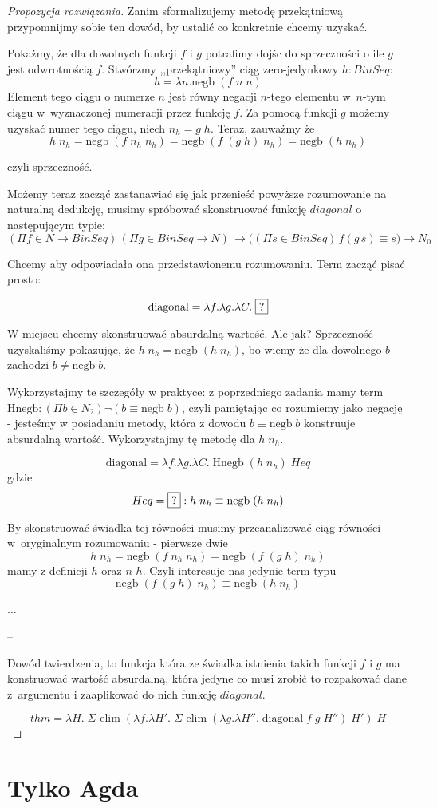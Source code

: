 \documentclass[11pt, a4paper]{article}
\begin{document}
\begin{proof}[Propozycja rozwiązania]
Zanim sformalizujemy metodę przekątniową przypomnijmy sobie ten dowód, by ustalić co konkretnie chcemy uzyskać.

Pokażmy, że dla dowolnych funkcji $f$ i $g$ potrafimy dojśc do sprzeczności o ile $g$ jest odwrotnością $f$.
Stwórzmy ,,przekątniowy'' ciąg zero-jedynkowy $h : BinSeq$:
\[
 h = \lambda n. \mbox{negb}\;(f\;n\;n)
\]
Element tego ciągu o numerze $n$ jest równy negacji $n$-tego elementu w~$n$-tym ciągu w~wyznaczonej numeracji
przez funkcję $f$. Za pomocą funkcji $g$ możemy uzyskać numer tego ciągu, niech $n_h = g\;h$. Teraz, zauważmy że
\[
h\;n_h = \mbox{negb}\;(f\;n_h\;n_h) = \mbox{negb}\;(f\;(g\;h)\;n_h) = \mbox{negb}\;(h \;n_h)
\]

czyli sprzeczność.


Możemy teraz zacząć zastanawiać się jak przenieść powyższe rozumowanie na naturalną dedukcję, musimy
spróbować skonstruować
funkcję $diagonal$ o następującym typie:
{
\small
\[
 (\Pi f \in N \to BinSeq)\, (\Pi g \in BinSeq \to N)\,
\to
\big(
(\Pi s \in BinSeq)\,f (g\, s) \equiv s 
\big)
\to N_0
\]
}

Chcemy aby odpowiadała ona przedstawionemu rozumowaniu. Term zacząć pisać prosto:

\[
  \mbox{diagonal} = \lambda f.\lambda g. \lambda C.\; \framebox{?}
\]

W miejscu  chcemy skonstruować absurdalną wartość. Ale jak? Sprzeczność uzyskaliśmy
pokazując, że $h\;n_h = \mbox{negb}\; (h\;n_h)$, bo wiemy że dla dowolnego $b$ zachodzi $b \not= \mbox{negb}\;b$.

Wykorzystajmy te szczegóły w praktyce: z poprzedniego zadania mamy term
$\mbox{Hnegb} : (\Pi b \in N_2) \neg (b \equiv \mbox{negb}\;b)$, czyli pamiętając co rozumiemy
jako negację - jesteśmy w posiadaniu metody, która z dowodu $b \equiv \mbox{negb}\;b$ konstruuje
absurdalną wartość. Wykorzystajmy tę metodę dla $h\;n_h$.

\[
  \mbox{diagonal} = \lambda f.\lambda g. \lambda C.\; \mbox{Hnegb}\; (h\;n_h)\; Heq
\]
gdzie
\[
 Heq = \framebox{?} : h\;n_h \equiv \mbox{negb}\; (h\;n_h)
\]

By skonstruować świadka tej równości musimy przeanalizować ciąg równości w~oryginalnym rozumowaniu - pierwsze dwie
\[
h\;n_h = \mbox{negb}\;(f\;n_h\;n_h) = \mbox{negb}\;(f\;(g\;h)\;n_h)
\]
mamy z definicji $h$ oraz $n\_h$. Czyli interesuje nas jedynie term typu
\[
\mbox{negb}\;(f\;(g\;h)\;n_h) \equiv \mbox{negb}\; (h\;n_h)
\]

...

--

Dowód twierdzenia, to funkcja która ze świadka istnienia takich funkcji $f$ i $g$ ma konstruować wartość absurdalną, która
jedyne co musi zrobić to rozpakować dane z~argumentu i zaaplikować do nich funkcję $diagonal$. 

\[
thm = 
 \lambda H.\;
 \Sigma\mbox{-elim}\;
(\lambda f. \lambda H'.\; \Sigma\mbox{-elim}\; (\lambda g. \lambda H''.\;
\mbox{diagonal}\;f\;g\;H''
)\;
H')\;H
\]

\end{proof}

\section{Tylko Agda}
\end{document}
